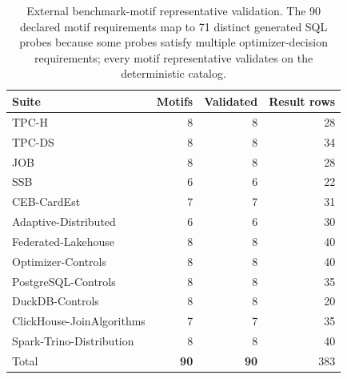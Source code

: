 \begin{table}[t]
\centering
\caption{External benchmark-motif representative validation. The 90 declared motif requirements map to 71 distinct generated SQL probes because some probes satisfy multiple optimizer-decision requirements; every motif representative validates on the deterministic catalog.}
\label{tab:external-execution}
\small
\begin{tabular}{lrrr}
\toprule
Suite & Motifs & Validated & Result rows \\
\midrule
TPC-H & 8 & 8 & 28 \\
TPC-DS & 8 & 8 & 34 \\
JOB & 8 & 8 & 28 \\
SSB & 6 & 6 & 22 \\
CEB-CardEst & 7 & 7 & 31 \\
Adaptive-Distributed & 6 & 6 & 30 \\
Federated-Lakehouse & 8 & 8 & 40 \\
Optimizer-Controls & 8 & 8 & 40 \\
PostgreSQL-Controls & 8 & 8 & 35 \\
DuckDB-Controls & 8 & 8 & 20 \\
ClickHouse-JoinAlgorithms & 7 & 7 & 35 \\
Spark-Trino-Distribution & 8 & 8 & 40 \\
\midrule
Total & \textbf{90} & \textbf{90} & 383 \\
\bottomrule
\end{tabular}
\end{table}
